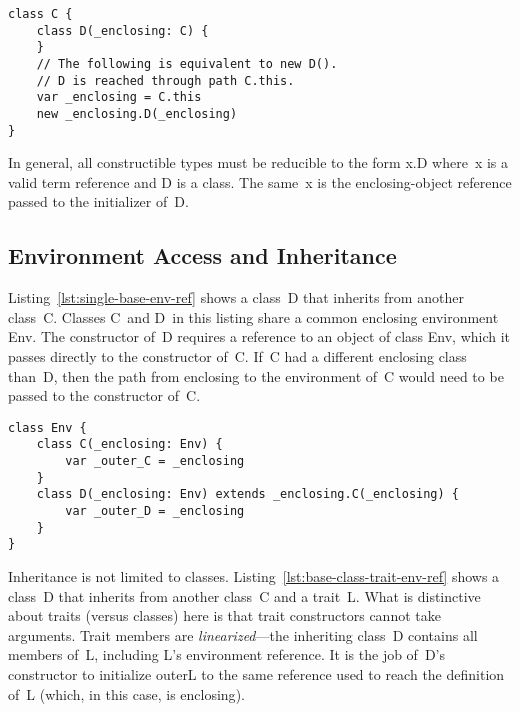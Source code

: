 \begin{lstlisting}[float=htbp, caption={Path Dependence and Enclosing References}, label={lst:new-path-dep}]
class C {
	class D(_enclosing: C) {
	}
	// The following is equivalent to new D().
	// D is reached through path C.this.
	var _enclosing = C.this
	new _enclosing.D(_enclosing)
}
\end{lstlisting}

In general, all constructible types must be reducible to the form \mbox{\cd x.D} where~{\cd x} is a valid term reference and {\cd D} is a class. The same~{\cd x} is the enclosing-object reference passed to the initializer of~{\cd D}.





\subsection{Environment Access and Inheritance}

Listing~\ref{lst:single-base-env-ref} shows a class~{\cd D} that inherits from another class~{\cd C}. Classes {\cd C}~and {\cd D}~in this listing share a common enclosing environment {\cd Env}. The constructor of~{\cd D} requires a reference to an object of class {\cd Env}, which it passes directly to the constructor of~{\cd C}. If~{\cd C} had a different enclosing class than~{\cd D}, then the path from {\cd \und enclosing} to the environment of~{\cd C} would need to be passed to the constructor of~{\cd C}. 



\begin{lstlisting}[float=htbp, caption={Single Base Class with Environment Reference}, label={lst:single-base-env-ref}]
class Env {
	class C(_enclosing: Env) {
		var _outer_C = _enclosing
	}
	class D(_enclosing: Env) extends _enclosing.C(_enclosing) {
		var _outer_D = _enclosing
	}
}
\end{lstlisting}

Inheritance is not limited to classes.
Listing~\ref{lst:base-class-trait-env-ref} shows a class~{\cd D} that inherits from another class~{\cd C} and a trait~{\cd L}. What is distinctive about traits (versus classes) here is that trait constructors cannot take arguments. Trait members are {\em linearized}---the inheriting class~{\cd D} contains all members of~{\cd L}, including \mbox{{\cd L}'s} environment reference. It is the job of~\mbox{{\cd D}'s} constructor to initialize {\cd \und outer\und L} to the same reference used to reach the definition of~{\cd L} (which, in this case, is {\cd \und enclosing}).

